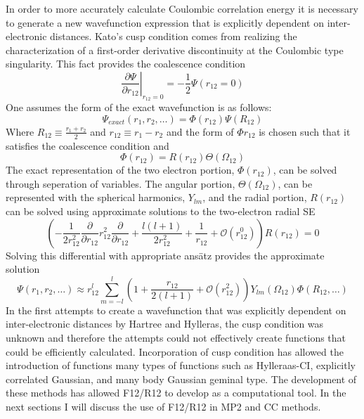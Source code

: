     In order to more accurately calculate Coulombic correlation energy it is necessary to generate a new wavefunction expression that is explicitly dependent on inter-electronic distances. Kato's cusp condition\cite{kato 1957} comes from realizing the characterization of a first-order derivative discontinuity at the Coulombic type singularity\cite{Hatting 2012}. This fact provides the coalescence condition 
      \begin{equation}
          \left. \frac{\partial \Psi}{\partial r_{12}} \right |_{r_{12}=0} = - \frac{1}{2} \Psi(r_{12}=0)
        \end{equation}
    One assumes the form of the exact wavefunction is as follows:
      \begin{equation}
        \Psi_{exact}(r_1, r_2 , \dots) = \Phi(r_{12})\Psi(R_{12})
      \end{equation}
    Where $R_{12} \equiv \frac{r_1 + r_2}{2}$ and $r_{12} \equiv r_1 - r_2$ and the form of $\Phi{r_{12}}$ is chosen such that it satisfies the coalescence condition and 
      \begin{equation}
        \Phi(r_{12}) = R(r_{12})\Theta(\Omega_{12})
      \end{equation}
    The exact representation of the two electron portion, $\Phi(r_{12})$, can be solved through seperation of variables.  The angular portion, $\Theta(\Omega_{12})$, can be represented with the spherical harmonics, $Y_{lm}$, and the radial portion, $R(r_{12})$ can be solved using approximate solutions to the two-electron radial SE
      \begin{equation}
        \left( -\frac{1}{2r^2_{12}} \frac{\partial}{\partial r_{12}} r^2_{12} \frac{\partial}{\partial r_{12}} + \frac{l(l+1)}{2r^2_{12}} + \frac{1}{r_{12}} + \mathcal{O}(r^0_{12}) \right) R(r_{12}) = 0
      \end{equation}
    Solving this differential with appropriate ans{\"a}tz provides the approximate solution
      \begin{equation}
        \Psi(r_1, r_2, \dots) \approx r^l_{12} \sum_{m=-l}^l\left( 1 + \frac{r_{12}}{2(l+1)} + \mathcal{O}(r^2_{12})\right) Y_{lm}(\Omega_{12})\Phi(R_{12},\dots)
      \end{equation}
    In the first attempts to create a wavefunction that was explicitly dependent on inter-electronic distances by Hartree \cite{Hartree 1928} and Hylleras\cite{Hylleras 1929}, the cusp condition was unknown and therefore the attempts could not effectively create functions that could be efficiently calculated.  Incorporation of cusp condition has allowed the introduction of functions many types of functions such as Hylleraas-CI, explicitly correlated Gaussian, and many body Gaussian geminal type.\cite{Kong 2012}  The development of these methods has allowed F12/R12 to develop as a computational tool.
    In the next sections I will discuss the use of F12/R12 in MP2 and CC methods.
